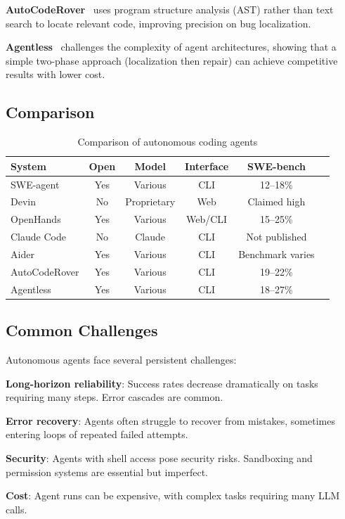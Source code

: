 \textbf{AutoCodeRover}~\citep{zhang2024autocoderover} uses program structure analysis (AST) rather than text search to locate relevant code, improving precision on bug localization.

\textbf{Agentless}~\citep{xia2024agentless} challenges the complexity of agent architectures, showing that a simple two-phase approach (localization then repair) can achieve competitive results with lower cost.

\subsection{Comparison}

\begin{table}[h]
\centering
\caption{Comparison of autonomous coding agents}
\label{tab:agents}
\begin{tabular}{lccccc}
\toprule
\textbf{System} & \textbf{Open} & \textbf{Model} & \textbf{Interface} & \textbf{SWE-bench} \\
\midrule
SWE-agent & Yes & Various & CLI & 12--18\% \\
Devin & No & Proprietary & Web & Claimed high \\
OpenHands & Yes & Various & Web/CLI & 15--25\% \\
Claude Code & No & Claude & CLI & Not published \\
Aider & Yes & Various & CLI & Benchmark varies \\
AutoCodeRover & Yes & Various & CLI & 19--22\% \\
Agentless & Yes & Various & CLI & 18--27\% \\
\bottomrule
\end{tabular}
\end{table}

\subsection{Common Challenges}

Autonomous agents face several persistent challenges:

\textbf{Long-horizon reliability}: Success rates decrease dramatically on tasks requiring many steps. Error cascades are common.

\textbf{Error recovery}: Agents often struggle to recover from mistakes, sometimes entering loops of repeated failed attempts.

\textbf{Security}: Agents with shell access pose security risks. Sandboxing and permission systems are essential but imperfect.

\textbf{Cost}: Agent runs can be expensive, with complex tasks requiring many LLM calls.
